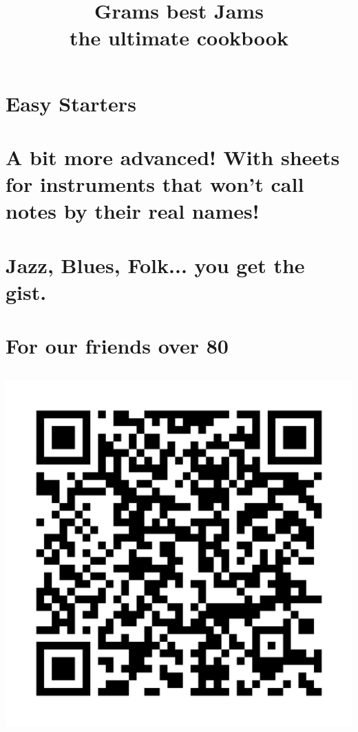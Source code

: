 \documentclass[openany]{book}
\title{Grams best Jams\\the ultimate cookbook}
\author{}
\date{}
\begin{document}
\maketitle
\frontmatter
\tableofcontents



\part{Easy Starters}






\part{A bit more advanced! With sheets for instruments that won't call notes by their real names!}






\part{Jazz, Blues, Folk... you get the gist. }








%


\part{For our friends over 80}




\chapter[]{}
\includegraphics[width=1\linewidth]{QR_Codes/QR_SpotifyPlaylist.png}

\
\end{document}
